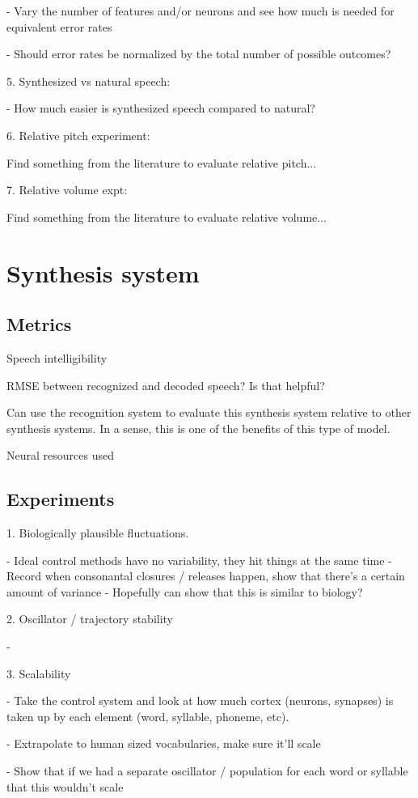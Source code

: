 - Vary the number of features and/or neurons and see
  how much is needed for equivalent error rates

  - Should error rates be normalized by the total number
    of possible outcomes?

5. Synthesized vs natural speech:

- How much easier is synthesized speech compared to natural?

6. Relative pitch experiment:

Find something from the literature to evaluate relative pitch...

7. Relative volume expt:

Find something from the literature to evaluate relative volume...

\section{Synthesis system}

\subsection{Metrics}

Speech intelligibility

RMSE between recognized and decoded speech?
Is that helpful?

Can use the recognition system to evaluate
this synthesis system relative to other
synthesis systems.
In a sense, this is one of the benefits
of this type of model.

Neural resources used

\subsection{Experiments}

1. Biologically plausible fluctuations.

- Ideal control methods have no variability, they hit things at the same time
- Record when consonantal closures / releases happen, show that there's
  a certain amount of variance
- Hopefully can show that this is similar to biology?

2. Oscillator / trajectory stability

-

3. Scalability

- Take the control system and look at how much cortex (neurons, synapses)
  is taken up by each element (word, syllable, phoneme, etc).

- Extrapolate to human sized vocabularies, make sure it'll scale

- Show that if we had a separate oscillator / population
  for each word or syllable that this wouldn't scale
